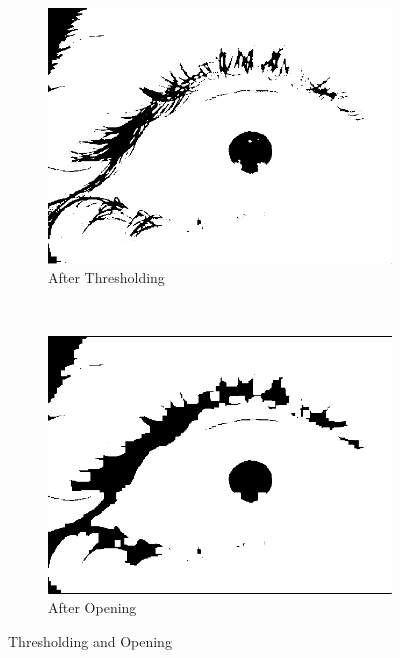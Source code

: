 \begin{figure}[h!]
	\centering
	
	\begin{subfigure}[b]{0.5\textwidth}
		\centering
		\includegraphics[width=\textwidth]{Handin1/images/thresh.png}
		\caption{After Thresholding}
		\label{subfig:thresh}
	\end{subfigure}%
	~
	\begin{subfigure}[b]{0.5\textwidth}
		\centering
		\includegraphics[width=\textwidth]{Handin1/images/open.png}
		\caption{After Opening}
		\label{subfig:open}
	\end{subfigure}
	
	\caption{Thresholding and Opening}
	\label{fig:threshopen}
\end{figure}


